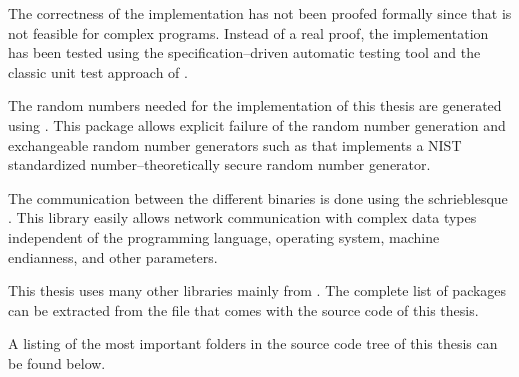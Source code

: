 The correctness of the implementation has not been proofed formally since that
is not feasible for complex programs. Instead of a real proof, the
implementation has been tested using the specification--driven automatic
\JWThaskell{} testing tool \JWTquickcheck{} \cite{quickcheck} and the classic
unit test approach of \JWTLhunit{}.



The random numbers needed for the implementation of this thesis are generated
using \JWTLmonadcryptorandom{}. This package allows explicit failure of the
random number generation and exchangeable random number generators such as
\JWTLdrbg{} that implements a NIST standardized number--theoretically secure
random number generator.



The communication between the different binaries is done using the schrieblesque
\JWTXLprotobuf{}. This library easily allows network communication with complex
data types independent of the programming language, operating system, machine
endianness, and other parameters.



This thesis uses many other libraries mainly from \JWTLhackage{}. The
complete list of packages can be extracted from the file
 that comes with the source code of this thesis.


\label{sec:src-org}

A listing of the most important folders in the source code tree of this thesis
can be found below.

